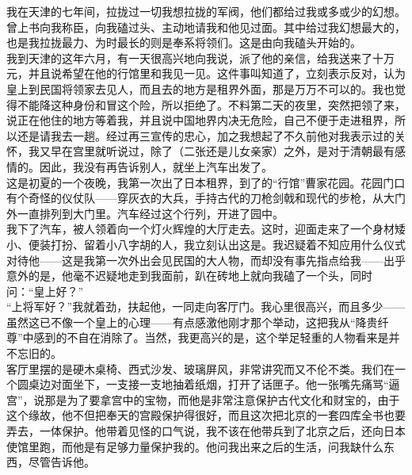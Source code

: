 我在天津的七年间，拉拢过一切我想拉拢的军阀，他们都给过我或多或少的幻想。曾上书向我称臣，向我磕过头、主动地请我和他见过面。其中给过我幻想最大的，也是我拉拢最力、为时最长的则是奉系将领们。这是由向我磕头开始的。\\

我到天津的这年六月，有一天很高兴地向我说，派了他的亲信，给我送来了十万元，并且说希望在他的行馆里和我见一见。这件事叫知道了，立刻表示反对，认为皇上到民国将领家去见人，而且去的地方是租界外面，那是万万不可以的。我也觉得不能降这种身份和冒这个险，所以拒绝了。不料第二天的夜里，突然把领了来，说正在他住的地方等着我，并且说中国地界内决无危险，自己不便于走进租界，所以还是请我去一趟。经过再三宣传的忠心，加之我想起了不久前他对我表示过的关怀，我又早在宫里就听说过，除了（二张还是儿女亲家）之外，是对于清朝最有感情的。因此，我没有再告诉别人，就坐上汽车出发了。\\

这是初夏的一个夜晚，我第一次出了日本租界，到了的“行馆”曹家花园。花园门口有个奇怪的仪仗队——穿灰衣的大兵，手持古代的刀枪剑戟和现代的步枪，从大门外一直排列到大门里。汽车经过这个行列，开进了园中。\\

我下了汽车，被人领着向一个灯火辉煌的大厅走去。这时，迎面走来了一个身材矮小、便装打扮、留着小八字胡的人，我立刻认出这是。我迟疑着不知应用什么仪式对待他——这是我第一次外出会见民国的大人物，而却没有事先指点给我——出乎意外的是，他毫不迟疑地走到我面前，趴在砖地上就向我磕了一个头，同时问：“皇上好？”\\

“上将军好？”我就着劲，扶起他，一同走向客厅门。我心里很高兴，而且多少——虽然这已不像一个皇上的心理——有点感激他刚才那个举动，这把我从“降贵纤尊”中感到的不自在消除了。当然，我更高兴的是，这个举足轻重的人物看来是并不忘旧的。\\

客厅里摆的是硬木桌椅、西式沙发、玻璃屏风，非常讲究而又不伦不类。我们在一个圆桌边对面坐下，一支接一支地抽着纸烟，打开了话匣子。他一张嘴先痛骂“逼宫”，说那是为了要拿宫中的宝物，而他是非常注意保护古代文化和财宝的，由于这个缘故，他不但把奉天的宫殿保护得很好，而且这次把北京的一套四库全书也要弄去，一体保护。他带着见怪的口气说，我不该在他带兵到了北京之后，还向日本使馆里跑，而他是有足够力量保护我的。他问我出来之后的生活，问我缺什么东西，尽管告诉他。\\

